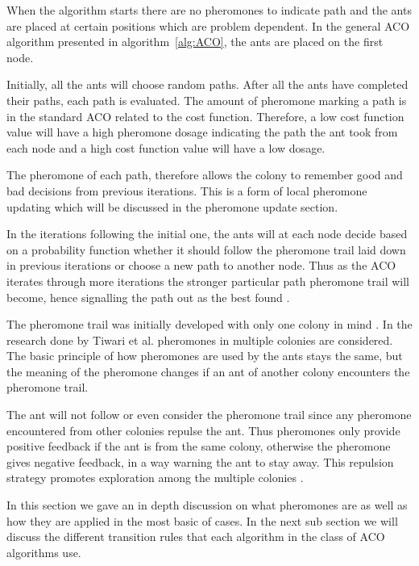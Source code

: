 When the algorithm starts there are no pheromones to indicate path and the ants are placed at certain positions which are problem dependent. In the general ACO algorithm presented in algorithm~\ref{alg:ACO}, the ants are placed on the first node. 

Initially, all the ants will choose random paths. After all the ants have completed their paths, each path is evaluated\cite{CompuIntelligenceIntro}. The amount of pheromone marking a path is in the standard ACO related to the cost function. Therefore, a low cost function value will have a high pheromone dosage indicating the path the ant took from each node and a high cost function value will have a low dosage\cite{CompuIntelligenceIntro}. 

The pheromone of each path, therefore allows the colony to remember good and bad decisions from previous iterations\cite{CompuIntelligenceIntro}. This is a form of local pheromone updating \label{def:localpheromoneupdate}which will be discussed in the pheromone update section. 

In the iterations following the initial one, the ants will at each node decide based on a probability function whether it should follow the pheromone trail laid down in previous iterations or choose a new path to another node. Thus as the ACO iterates through more iterations the stronger particular path pheromone trail will become, hence signalling the path out as the best found \cite{CompuIntelligenceIntro}.

The pheromone trail was initially developed with only one colony in mind \cite{CompuIntelligenceIntro}. In the research done by Tiwari et al. pheromones in multiple colonies are considered. The basic principle of how pheromones are used by the ants stays the same, but the meaning of the pheromone changes if an ant of another colony encounters the pheromone trail. 

The ant will not follow or even consider the pheromone trail since any pheromone encountered from other colonies repulse the ant. Thus pheromones only provide positive feedback if the ant is from the same colony, otherwise the pheromone gives negative feedback, in a way warning the ant to stay away. This repulsion strategy promotes exploration among the multiple colonies  \cite{ACOLargeProblem}.

In this section we gave an in depth discussion on what pheromones are as well as how they are applied in the most basic of cases. In the next sub section we will discuss the different transition rules that each algorithm in the class of ACO algorithms use.
